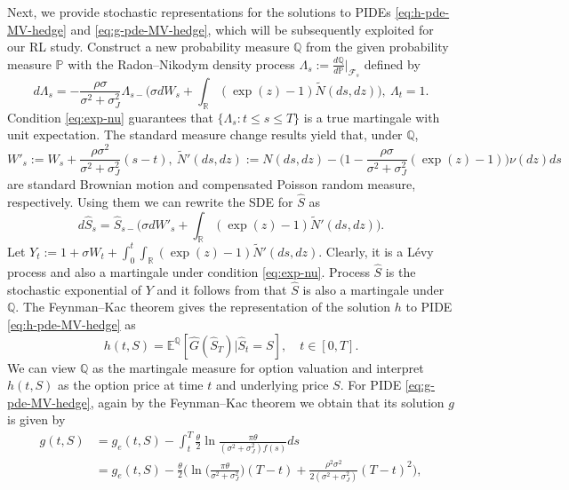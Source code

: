 \documentclass[11pt]{article}
\newcommand{\1}{\mathbbm{1}}
\begin{document}
Next, we provide stochastic representations for the solutions to PIDEs \eqref{eq:h-pde-MV-hedge} and \eqref{eq:g-pde-MV-hedge}, which will be subsequently exploited for our RL study. Construct a new probability measure $\mathbb{Q}$ from the given probability measure $\mathbb{P}$ with the Radon--Nikodym density process $\Lambda_s:=\frac{d\mathbb{Q}}{d\mathbb{P}}|_{\mathcal{F}_s}$ defined by
\begin{equation}
	d\Lambda_s = -\frac{\rho\sigma}{\sigma^2+\sigma_J^2}\Lambda_{s-} \bigg(\sigma dW_s + \int_{\mathbb{R}} (\exp(z)-1) \widetilde{N}(ds, dz)\bigg),\ \Lambda_t = 1.
\end{equation}
Condition \eqref{eq:exp-nu} guarantees that $\{\Lambda_s: t\leq s\leq T\}$ is a true martingale with unit expectation. The  standard measure change results yield that, under $\mathbb{Q}$,
\begin{equation}\label{eq:underQ}
	W'_s := W_s + \frac{\rho\sigma^2}{\sigma^2+\sigma_J^2}(s-t),\ \widetilde{N}'(ds,dz) := N(ds,dz) - \bigg(1-\frac{\rho\sigma}{\sigma^2+\sigma_J^2}(\exp(z)-1)\bigg)\nu(dz)ds
\end{equation}
are standard Brownian motion and compensated Poisson random measure, respectively. Using them we can rewrite the SDE for $\hat{S}$ as
\begin{equation}
	d\hat{S}_s = \hat{S}_{s-}\bigg(\sigma dW'_s + \int_{\mathbb{R}} (\exp(z)-1) \widetilde{N}'(ds, dz)\bigg).\label{eq:stock-MV-hedge-Q}
\end{equation}
Let $Y_t:=1+\sigma W_t + \int_0^t\int_{\mathbb{R}} (\exp(z)-1) \widetilde{N}'(ds, dz)$. Clearly, it is a L\'evy process and also a martingale under condition \eqref{eq:exp-nu}. Process $\hat{S}$ is the stochastic exponential of $Y$ and it follows from \cite[Proposition 8.23]{tankov2004financial} that $\hat{S}$ is also a martingale under $\mathbb{Q}$. The Feynman--Kac theorem gives the representation of the solution $h$ to PIDE \eqref{eq:h-pde-MV-hedge} as
\begin{equation}
	h(t,S) = \mathbb{E}^{\mathbb{Q}}[\hat{G}(\hat{S}_T)\big|\hat{S}_t=S],\quad t\in[0,T]. \label{eq:h-rep}
\end{equation}
We can view $\mathbb{Q}$ as the martingale measure for option valuation and interpret $h(t,S)$ as the option price at time $t$ and underlying price  $S$. For PIDE \eqref{eq:g-pde-MV-hedge}, again by the Feynman--Kac theorem we obtain that its solution $g$ is given by
\begin{align}
	g(t,S) &= g_e(t,S)-\int_t^T\frac{\theta}{2}\ln\frac{\pi\theta}{(\sigma^2+\sigma_J^2)f(s)}ds\\
	& = g_e(t,S) - \frac{\theta}{2}\bigg(\ln\bigg(\frac{\pi\theta}{\sigma^2 + \sigma_J^2}\bigg) (T - t) + \frac{\rho^2\sigma^2}{2(\sigma^2 + \sigma_J^2)}(T-t)^2\bigg), \label{eq:g-rep}
\end{align}
\end{document}
